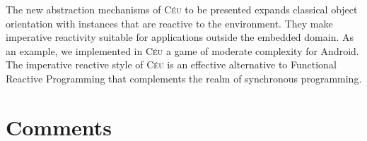 \documentclass[11pt,a4paper]{article}
\newcommand{\CEU}{\textsc{C\'{e}u}\xspace}
\begin{document}
The new abstraction mechanisms of \CEU to be presented expands classical object 
orientation with instances that are reactive to the environment.
%
They make imperative reactivity suitable for applications outside the embedded 
domain.
%
As an example, we implemented in \CEU a game of moderate complexity for 
Android.
%
The imperative reactive style of \CEU is an effective alternative to Functional 
Reactive Programming that complements the realm of synchronous programming.

\begin{comment}
programs close to specification

adv: convenience of imperative w/o the burden
also solves the callback hell
- big gap for imperative reactivity

React (vs FRP)
http://www.debjitbiswas.com/genuinely-functional-user-interfaces-and-react/

 170   541  6207 controllers.ceu
  20    51   518 fnts.ceu
 476  1765 18627 main.ceu
 575  1828 17676 objs.ceu
  33    94   918 points.ceu
  45   120  1351 snds.ceu
  94   254  2971 texs.ceu
1413  4653 48268 total
\end{comment}


\newpage

\section{Comments}
\end{document}
